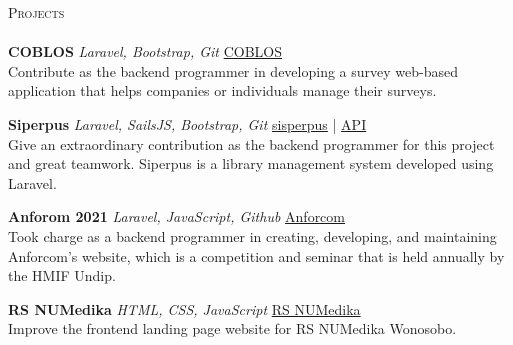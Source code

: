 \documentclass[a4paper]{article}
\newcommand{\lineunder} {
    \vspace*{-8pt} \\
    \hspace*{-18pt} \hrulefill \\
}
\newcommand{\header} [1] {
    {\hspace*{-18pt}\vspace*{6pt} \textsc{#1}}
    \vspace*{-6pt} \lineunder
}
\begin{document}
\header{Projects}
{\textbf{COBLOS}} {\sl Laravel, Bootstrap, Git} \hfill \href{https://coblos.herokuapp.com/}{COBLOS}\\
Contribute as the backend programmer in developing a survey web-based application that helps companies or individuals manage their surveys.\\
\vspace*{2mm}

{\textbf{Siperpus}} {\sl Laravel, SailsJS, Bootstrap, Git} \hfill \href{http://sisperpus.herokuapp.com/}{sisperpus} | \href{https://pbp-siperpus.herokuapp.com/}{API}\\
Give an extraordinary contribution as the backend programmer for this project and great teamwork. Siperpus is a library management system developed using Laravel. \\
\vspace*{2mm}

{\textbf{Anforom 2021}} {\sl Laravel, JavaScript, Github} \hfill \href{https://anforcom.com}{Anforcom}\\
Took charge as a backend programmer in creating, developing, and maintaining Anforcom's website, which is a competition and seminar that is held annually by the HMIF Undip.\\
\vspace*{2mm}



{\textbf{RS NUMedika}} {\sl HTML, CSS, JavaScript} \hfill \href{http://rsnuwonosobo.com/}{RS NUMedika}\\
Improve the frontend landing page website for RS NUMedika Wonosobo.\\
\vspace*{2mm}
\end{document}
